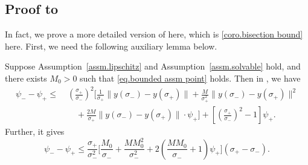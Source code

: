 \documentclass{mcom-l}
\numberwithin{equation}{section}
\begin{document}
\subsection{Proof to }
In fact, we prove a more detailed version of  here, which is \cref{coro.bisection bound} here. First, we need the following auxiliary lemma below.
\begin{lemma}
    \label{lem.bound gap bisection}
    Suppose Assumption~\ref{assm.lipschitz} and Assumption~\ref{assm.solvable} hold, and there exists $M_0>0$ such that \eqref{eq.bounded assm point} holds. Then in , we have
    \begin{equation}\label{eq.bound gap bisection}
        \begin{aligned}
            \psi_- - \psi_+
            \leq\; & \left( \frac{\sigma_+}{\sigma_-} \right)^2 \Bigg[
                \frac{1}{\sigma_+} \|y(\sigma_-)-y(\sigma_+)\|
            + \frac{M}{\sigma_+^2} \|y(\sigma_-)-y(\sigma_+)\|^2                          \\
                   & \quad + \frac{2M}{\sigma_+} \|y(\sigma_-)-y(\sigma_+)\| \cdot \psi_+
                \Bigg]
            + \left[ \left( \frac{\sigma_+}{\sigma_-} \right)^2 - 1 \right] \psi_+.
        \end{aligned}
    \end{equation}
    Further, it gives
    \begin{equation}
        \label{eq.bounded gap bisection sigma}
        \psi_- - \psi_+
        \leq \frac{\sigma_+}{\sigma_-^2} \Bigg[
            \frac{M_0}{\sigma_-}
            + \frac{M M_0^2}{\sigma_-^2}+ 2\left( \frac{M M_0}{\sigma_-} + 1 \right)\psi_+
            \Bigg](\sigma_+ - \sigma_-).
    \end{equation}
\end{lemma}
\end{document}
